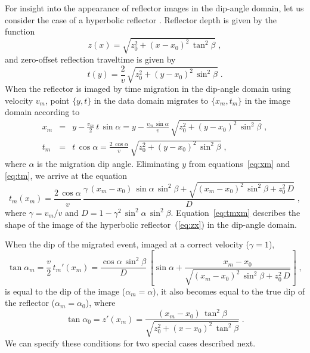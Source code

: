 For insight into the appearance of reflector images in the dip-angle domain, let us consider the case of a hyperbolic reflector \cite[]{fomel2013}.  
Reflector depth is given by the function
\begin{equation}
\label{eq:zx}
z(x)=\sqrt{z_0^2+(x-x_0)^2\,\tan^2\beta}\;,
\end{equation}
and zero-offset reflection traveltime is given by
\begin{equation}
\label{eq:ty}
  t(y)=\frac{2}{v}\,\sqrt{z_0^2+(y-x_0)^2\,\sin^2\beta}\;.
\end{equation}
When the reflector is imaged by time migration in the dip-angle domain
\cite[]{sava03} using velocity $v_m$, point $\{y,t\}$ in
the data domain migrates to $\{x_m,t_m\}$ in the image domain
according to 
\begin{eqnarray}
\label{eq:xm}
x_m & = & y - \frac{v_m}{2}\,t\,\sin{\alpha} = \displaystyle y - \frac{v_m\,\sin{\alpha}}{v}\,\sqrt{z_0^2+(y-x_0)^2\,\sin^2\beta}\;, \\
\label{eq:tm}
t_m & = & t\,\cos{\alpha} = \displaystyle \frac{2\,\cos{\alpha}}{v}\,\sqrt{z_0^2+(y-x_0)^2\,\sin^2\beta}\;,
\end{eqnarray}
where $\alpha$ is the migration dip angle. Eliminating $y$ from
equations~\ref{eq:xm} and \ref{eq:tm}, we arrive at the equation
\begin{equation}
\label{eq:tmxm}
  t_m(x_m) = \frac{2\,\cos{\alpha}}{v}\,\frac{\gamma\,(x_m-x_0)\,\sin{\alpha}\,\sin^2{\beta} + \sqrt{(x_m-x_0)^2\,\sin^2{\beta}+z_0^2\,D}}{D}\;,
\end{equation}
where $\gamma=v_m/v$ and
$D=1-\gamma^2\,\sin^2{\alpha}\,\sin^2{\beta}$. Equation~\ref{eq:tmxm}
describes the shape of the image of the hyperbolic
reflector~(\ref{eq:zx}) in the dip-angle domain.

When the dip of the migrated event, imaged at a correct velocity ($\gamma=1$),
\begin{equation}
  \tan{\alpha_m} = \displaystyle \frac{v}{2}\,t_m'(x_m) = 
  \frac{\cos{\alpha}\,\sin^2{\beta}}{D}\,\left[\sin{\alpha} 
    + \frac{x_m-x_0}{\sqrt{(x_m-x_0)^2\,\sin^2{\beta}+z_0^2\,D}}\right]\;,
  \label{eq:alfam}
\end{equation}
is equal to the dip of the image ($\alpha_m=\alpha$), it also becomes
equal to the true dip of the reflector ($\alpha_m=\alpha_0$), where 
\begin{equation}
\label{eq:alfa0}
\tan{\alpha_0} = z'(x_m) = \frac{(x_m-x_0)\,\tan^2{\beta}}{\sqrt{z_0^2+(x-x_0)^2\,\tan^2\beta}}\;.
\end{equation}
We can specify these conditions for two special cases described next.

